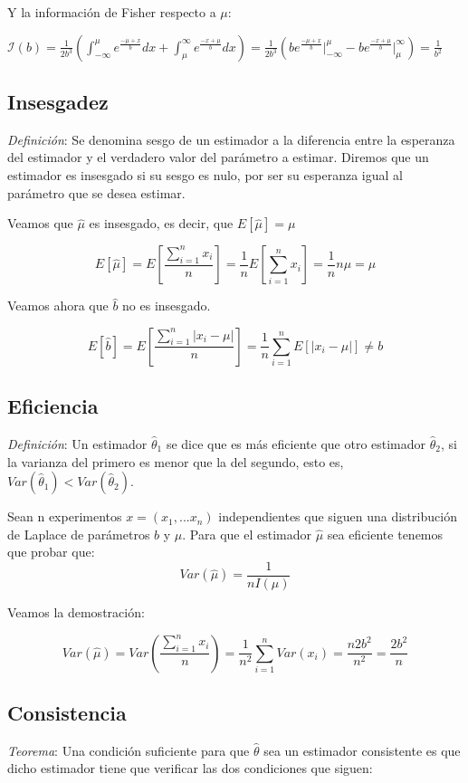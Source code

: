 \documentclass[a4paper, 10pt]{article} %
\begin{document}
Y la información de Fisher respecto a $\mu$:

$ \displaystyle \mathcal{I}(b) = \frac{1}{2b^3} \left(\int^\mu_{-\infty} e^{\frac{-\mu+x}{b}} dx +
\int^\infty_{\mu} e^{\frac{-x+\mu}{b}} dx \right) =  \frac{1}{2b^3} \left( b e^{\frac{-\mu+x}{b}} \Big|^\mu_{-\infty} -
b e^{\frac{-x+\mu}{b}} \Big|^\infty_{\mu}\right) = \frac{1}{b^2}$

\subsection{Insesgadez}
\emph{Definición}: Se denomina sesgo de un estimador a la diferencia entre la esperanza del estimador
y el verdadero valor del parámetro a estimar. Diremos que un estimador es insesgado si su sesgo es nulo, por ser
su esperanza igual al parámetro que se desea estimar.

Veamos que $\hat{\mu}$ es insesgado, es decir, que  $E\left[\hat{\mu}\right]=\mu$

$$E\left[\hat{\mu}\right] = E\left[\frac{\sum_{i=1}^{n}x_i}{n}\right] = \frac{1}{n}E\left[\sum_{i=1}^{n}x_i\right] = \frac{1}{n}n\mu = \mu $$

Veamos ahora que $\hat{b}$ no es insesgado. 

$$E\left[\hat{b}\right] = E\left[\frac{\sum_{i=1}^{n}|x_i - \mu|}{n}\right] = \frac{1}{n}\sum_{i=1}^{n}E\left[|x_i - \mu|\right] \neq b$$ 

\subsection{Eficiencia}
\emph{Definición}: Un estimador $\hat{\theta}_1$ se dice que es más eficiente que otro estimador
$\hat{\theta}_2$, si la varianza del primero es menor que la del segundo, esto es,  $Var(\hat{\theta}_1)<Var(\hat{\theta}_2)$.

Sean n experimentos $x=(x_1,...x_n)$ independientes que siguen una distribución de Laplace de parámetros $b$ y $\mu$. Para que el
estimador $\hat{\mu}$ sea eficiente tenemos que probar que:
$$Var(\hat{\mu})=\frac{1}{nI(\mu)}$$

Veamos la demostración: 

$$Var(\hat{\mu}) = Var\left(\frac{\sum_{i=1}^{n}x_i}{n}\right) = \frac{1}{n^2}\sum_{i=1}^{n}Var(x_i) = \frac{n 2 b^2}{n^2} =
\frac{2 b^2}{n}$$

\subsection{Consistencia}
\emph{Teorema}: Una condición suficiente para que $\hat{\theta}$ sea un estimador consistente es que
dicho estimador tiene que verificar las dos condiciones que siguen:
\end{document}

